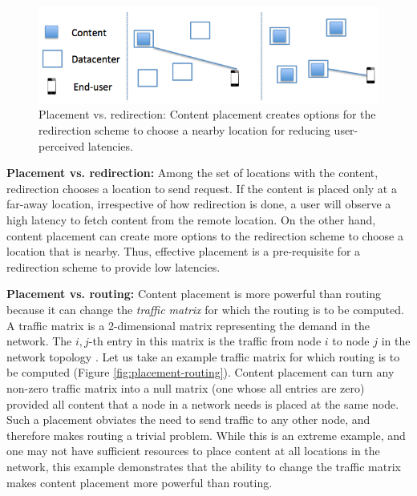 \begin{figure}
	
	\centering
	\includegraphics[scale=0.5]{fig/placement-vs-redirection.png}
	\caption{Placement vs. redirection: Content placement creates options for the redirection scheme to choose a nearby location for reducing user-perceived latencies.}	
	\label{fig:placement-redirection}
\end{figure}


\textbf{Placement vs. redirection:} Among the set of locations with the content, redirection chooses a location to send request. If the content is placed only at a far-away location, irrespective of how redirection is done, a user will observe a high latency to fetch content from the remote location. On the other hand, content placement can create more options to the redirection scheme to choose a location that is nearby. Thus, effective placement is a pre-requisite for a redirection scheme to provide low latencies.




\textbf{Placement vs. routing:} Content placement is more powerful than routing because it can change the \emph{traffic matrix} for which the routing is to be computed. A traffic matrix is a 2-dimensional matrix representing the demand in the network. The $i,j$-th entry in this matrix is the traffic from node $i$ to node $j$ in the network topology \cite{fortz2000internet}.  Let us take an example traffic matrix for which routing is to be computed (Figure \ref{fig:placement-routing}). Content placement can turn any non-zero traffic matrix into a null matrix (one whose all entries are zero) provided all content that a node in a network needs is placed at the same node. Such a placement obviates the need to send traffic to any other node, and therefore makes routing a trivial problem. While this is an extreme example, and one may not have sufficient resources to place content at all locations in the network, this example demonstrates that the ability to change the traffic matrix makes content placement more powerful than routing.

